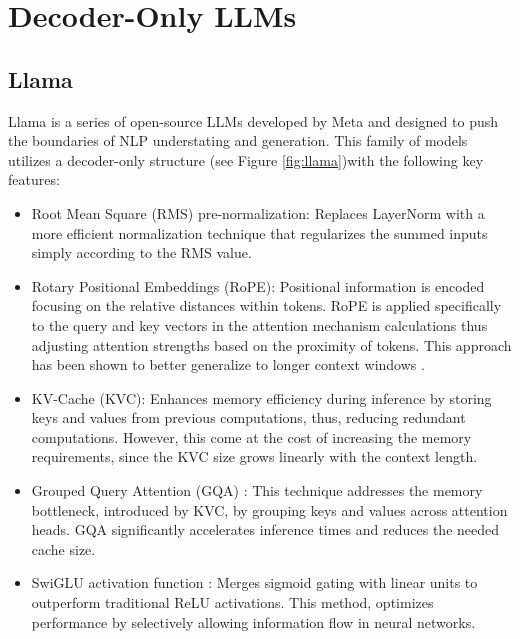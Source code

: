 \documentclass[11pt,english,listoffigures,listoftables]{tfgetsinf}
\begin{document}
\section{Decoder-Only LLMs}

\subsection{Llama}

Llama is a series of open-source LLMs developed by Meta and designed to push the boundaries of NLP understating and generation. This family of models utilizes a decoder-only structure (see Figure \ref{fig:llama})with the following key features:
%
\begin{itemize}
    \item Root Mean Square (RMS) \cite{zhang2019rms} pre-normalization: Replaces LayerNorm with a more efficient normalization technique that regularizes the summed inputs simply according to the RMS value.

    \item Rotary Positional Embeddings (RoPE)\cite{shaw2018RoPE}: Positional information is encoded focusing on the relative distances within tokens. RoPE is applied specifically to the query and key vectors in the attention mechanism calculations thus adjusting attention strengths based on the proximity of tokens. This approach has been shown to better generalize to longer context windows \cite{su2024roformer}.

    \item KV-Cache (KVC): Enhances memory efficiency during inference by storing keys and values from previous computations, thus, reducing redundant computations. However, this come at the cost of increasing the memory requirements, since the KVC size grows linearly with the context length.

    \item Grouped Query Attention (GQA) \cite{ainslie2023gqa}: This technique addresses the memory bottleneck, introduced by KVC, by grouping keys and values across attention heads. GQA significantly accelerates inference times and reduces the needed cache size.
    \item SwiGLU activation function \cite{shazeer2020glu}: Merges sigmoid gating with linear units to outperform traditional ReLU activations. This method, optimizes performance by selectively allowing information flow in neural networks.
\end{itemize}
\end{document}
